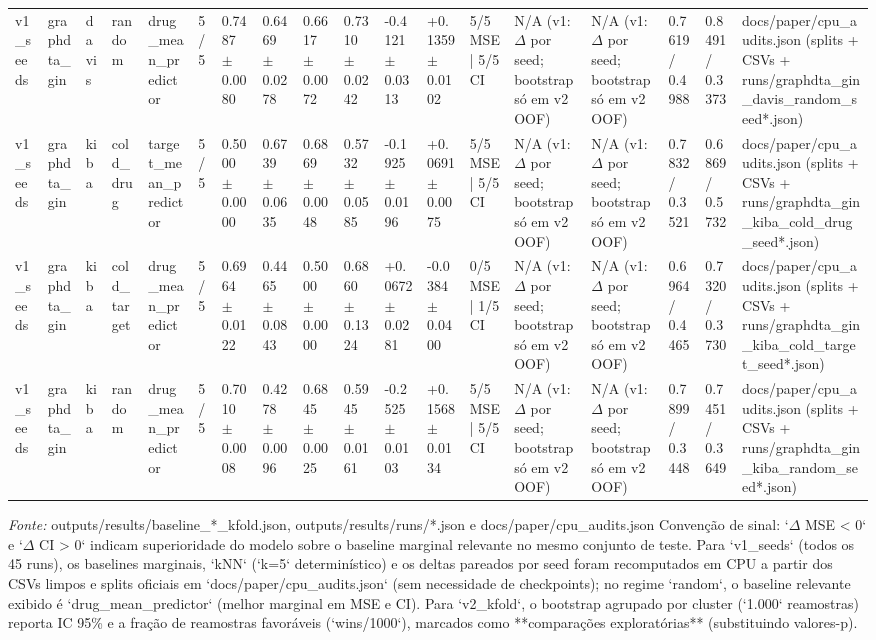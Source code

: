 \begin{table}[htbp]
\begin{tabular}{llllllllllllllllll}
v1\_seeds & graphdta\_gin & davis & random & drug\_mean\_predictor & 5/5 & 0.7487 $\pm$ 0.0080 & 0.6469 $\pm$ 0.0278 & 0.6617 $\pm$ 0.0072 & 0.7310 $\pm$ 0.0242 & -0.4121 $\pm$ 0.0313 & +0.1359 $\pm$ 0.0102 & 5/5 MSE | 5/5 CI & N/A (v1: $\Delta$ por seed; bootstrap só em v2 OOF) & N/A (v1: $\Delta$ por seed; bootstrap só em v2 OOF) & 0.7619 / 0.4988 & 0.8491 / 0.3373 & docs/paper/cpu\_audits.json (splits + CSVs + runs/graphdta\_gin\_davis\_random\_seed*.json) \\
v1\_seeds & graphdta\_gin & kiba & cold\_drug & target\_mean\_predictor & 5/5 & 0.5000 $\pm$ 0.0000 & 0.6739 $\pm$ 0.0635 & 0.6869 $\pm$ 0.0048 & 0.5732 $\pm$ 0.0585 & -0.1925 $\pm$ 0.0196 & +0.0691 $\pm$ 0.0075 & 5/5 MSE | 5/5 CI & N/A (v1: $\Delta$ por seed; bootstrap só em v2 OOF) & N/A (v1: $\Delta$ por seed; bootstrap só em v2 OOF) & 0.7832 / 0.3521 & 0.6869 / 0.5732 & docs/paper/cpu\_audits.json (splits + CSVs + runs/graphdta\_gin\_kiba\_cold\_drug\_seed*.json) \\
v1\_seeds & graphdta\_gin & kiba & cold\_target & drug\_mean\_predictor & 5/5 & 0.6964 $\pm$ 0.0122 & 0.4465 $\pm$ 0.0843 & 0.5000 $\pm$ 0.0000 & 0.6860 $\pm$ 0.1324 & +0.0672 $\pm$ 0.0281 & -0.0384 $\pm$ 0.0400 & 0/5 MSE | 1/5 CI & N/A (v1: $\Delta$ por seed; bootstrap só em v2 OOF) & N/A (v1: $\Delta$ por seed; bootstrap só em v2 OOF) & 0.6964 / 0.4465 & 0.7320 / 0.3730 & docs/paper/cpu\_audits.json (splits + CSVs + runs/graphdta\_gin\_kiba\_cold\_target\_seed*.json) \\
v1\_seeds & graphdta\_gin & kiba & random & drug\_mean\_predictor & 5/5 & 0.7010 $\pm$ 0.0008 & 0.4278 $\pm$ 0.0096 & 0.6845 $\pm$ 0.0025 & 0.5945 $\pm$ 0.0161 & -0.2525 $\pm$ 0.0103 & +0.1568 $\pm$ 0.0134 & 5/5 MSE | 5/5 CI & N/A (v1: $\Delta$ por seed; bootstrap só em v2 OOF) & N/A (v1: $\Delta$ por seed; bootstrap só em v2 OOF) & 0.7899 / 0.3448 & 0.7451 / 0.3649 & docs/paper/cpu\_audits.json (splits + CSVs + runs/graphdta\_gin\_kiba\_random\_seed*.json) \\
\bottomrule
\end{tabular}
\begin{flushleft}
\footnotesize \textit{Fonte:} outputs/results/baseline\_*\_kfold.json, outputs/results/runs/*.json e docs/paper/cpu\_audits.json Convenção de sinal: `$\Delta$ MSE < 0` e `$\Delta$ CI > 0` indicam superioridade do modelo sobre o baseline marginal relevante no mesmo conjunto de teste. Para `v1\_seeds` (todos os 45 runs), os baselines marginais, `kNN` (`k=5` determinístico) e os deltas pareados por seed foram recomputados em CPU a partir dos CSVs limpos e splits oficiais em `docs/paper/cpu\_audits.json` (sem necessidade de checkpoints); no regime `random`, o baseline relevante exibido é `drug\_mean\_predictor` (melhor marginal em MSE e CI). Para `v2\_kfold`, o bootstrap agrupado por cluster (`1.000` reamostras) reporta IC 95\% e a fração de reamostras favoráveis (`wins/1000`), marcados como **comparações exploratórias** (substituindo valores-p).
\end{flushleft}
\end{table}
